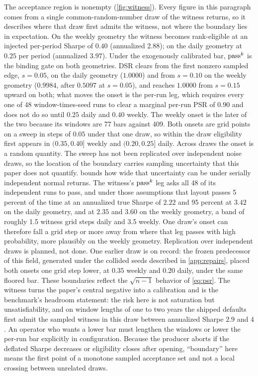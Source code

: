 The acceptance region is nonempty (\cref{fig:witness}). Every figure in this paragraph comes from a single common-random-number draw of the witness returns, so it describes where that draw first admits the witness, not where the boundary lies in expectation. On the weekly geometry the witness becomes rank-eligible at an injected per-period Sharpe of $0.40$ (annualized $2.88$); on the daily geometry at $0.25$ per period (annualized $3.97$). Under the exogenously calibrated bar, $\text{pass}^{k}$ is the binding gate on both geometries. DSR clears from the first nonzero sampled edge, $s = 0.05$, on the daily geometry ($1.0000$) and from $s = 0.10$ on the weekly geometry ($0.9984$, after $0.5097$ at $s = 0.05$), and reaches $1.0000$ from $s = 0.15$ upward on both; what moves the onset is the per-run leg, which requires every one of 48 window-times-seed runs to clear a marginal per-run PSR of $0.90$ and does not do so until $0.25$ daily and $0.40$ weekly. The weekly onset is the later of the two because its windows are 77 bars against 409. Both onsets are grid points on a sweep in steps of $0.05$ under that one draw, so within the draw eligibility first appears in $(0.35, 0.40]$ weekly and $(0.20, 0.25]$ daily. Across draws the onset is a random quantity. The sweep has not been replicated over independent noise draws, so the location of the boundary carries sampling uncertainty that this paper does not quantify.  bounds how wide that uncertainty can be under serially independent normal returns. The witness's $\text{pass}^{k}$ leg asks all 48 of its independent runs to pass, and under those assumptions that layout passes 5 percent of the time at an annualized true Sharpe of $2.22$ and 95 percent at $3.42$ on the daily geometry, and at $2.35$ and $3.60$ on the weekly geometry, a band of roughly 1.5 witness grid steps daily and 3.5 weekly. One draw's onset can therefore fall a grid step or more away from where that leg passes with high probability, more plausibly on the weekly geometry. Replication over independent draws is planned, not done. One earlier draw is on record: the frozen predecessor of this field, generated under the collided seeds described in \cref{app:repairs}, placed both onsets one grid step lower, at $0.35$ weekly and $0.20$ daily, under the same floored bar. These boundaries reflect the $\sqrt{n-1}$ behavior of \cref{eq:psr}. The witness turns the paper's central negative into a calibration and is the benchmark's headroom statement: the risk here is not saturation but unsatisfiability, and on window lengths of one to two years the shipped defaults first admit the sampled witness in this draw between annualized Sharpe $2.9$ and $4$. An operator who wants a lower bar must lengthen the windows or lower the per-run bar explicitly in configuration. Because the producer aborts if the deflated Sharpe decreases or eligibility closes after opening, ``boundary'' here means the first point of a monotone sampled acceptance set and not a local crossing between unrelated draws.


